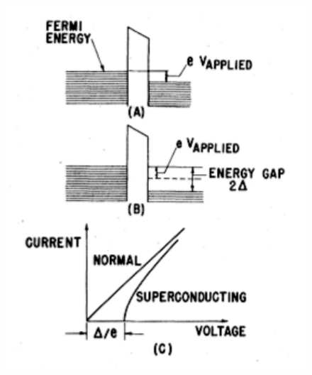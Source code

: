 \begin{frame}
\begin{columns}
\begin{column}{0.5\textwidth}
\begin{figure}[!h]
	\includegraphics[width=\textwidth]{fermi_levels2}
	\end{figure}
\end{column}
\end{columns}


\end{frame}
\begin{frame}
\frametitle{}

\end{frame}
\begin{frame}
\frametitle{}

\end{frame}
